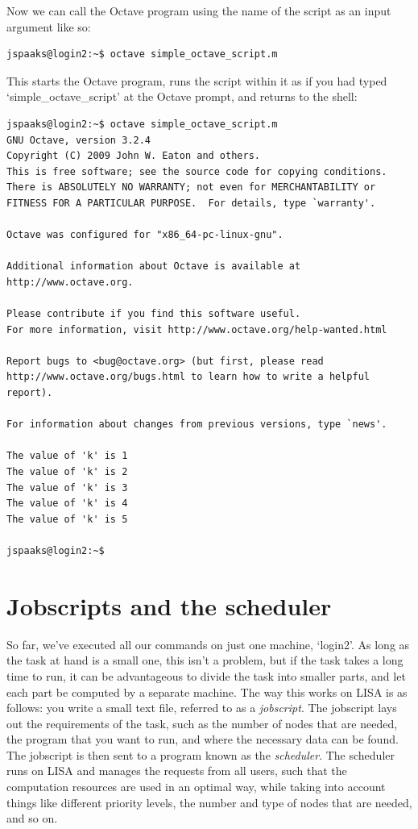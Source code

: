 Now we can call the Octave program using the name of the script as an input argument like so:
\begin{lstlisting}[style=basic,style=bash]
jspaaks@login2:~$ octave simple_octave_script.m
\end{lstlisting}
This starts the Octave program, runs the script within it as if you had typed `simple\_octave\_script' at the Octave prompt, and returns to the shell:
\begin{lstlisting}[style=basic,style=bash]
jspaaks@login2:~$ octave simple_octave_script.m
GNU Octave, version 3.2.4
Copyright (C) 2009 John W. Eaton and others.
This is free software; see the source code for copying conditions.
There is ABSOLUTELY NO WARRANTY; not even for MERCHANTABILITY or
FITNESS FOR A PARTICULAR PURPOSE.  For details, type `warranty'.

Octave was configured for "x86_64-pc-linux-gnu".

Additional information about Octave is available at http://www.octave.org.

Please contribute if you find this software useful.
For more information, visit http://www.octave.org/help-wanted.html

Report bugs to <bug@octave.org> (but first, please read
http://www.octave.org/bugs.html to learn how to write a helpful report).

For information about changes from previous versions, type `news'.

The value of 'k' is 1
The value of 'k' is 2
The value of 'k' is 3
The value of 'k' is 4
The value of 'k' is 5

jspaaks@login2:~$
\end{lstlisting}

\section{Jobscripts and the scheduler}

So far, we've executed all our commands on just one machine, `login2'. As long as the task at hand is a small one, this isn't a problem, but if the task takes a long time to run, it can be advantageous to divide the task into smaller parts, and let each part be computed by a separate machine. The way this works on LISA is as follows: you write a small text file, referred to as a  \textit{jobscript}. The jobscript lays out the requirements of the task, such as the number of nodes that are needed, the program that you want to run, and where the necessary data can be found. The jobscript is then sent to a program known as the \textit{scheduler}. The scheduler runs on LISA and manages the requests from all users, such that the computation resources are used in an optimal way, while taking into account things like different priority levels, the number and type of nodes that are needed, and so on.

